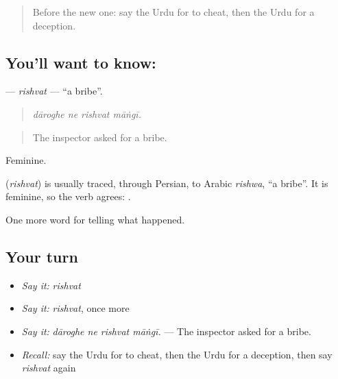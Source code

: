 \label{lesson:UR-C281-rishvat}



\begin{quote}
Before the new one: say the Urdu for to cheat, then the Urdu for a deception.
\end{quote}

\subsection*{You'll want to know: }
\textbf{} — \emph{rishvat} — \textquotedblleft{}a bribe\textquotedblright{}.

\begin{quote}
   
\end{quote}

\begin{quote}
\emph{dāroghe ne rishvat māṅgī.}
\end{quote}

\begin{quote}
The inspector asked for a bribe.
\end{quote}

Feminine.

\begin{cousinweb}
\textbf{} (\emph{rishvat}) is usually traced, through Persian, to Arabic \emph{rishwa}, \textquotedblleft{}a bribe\textquotedblright{}. It is feminine, so the verb agrees: \textbf{ }.
\end{cousinweb}

\begin{grammarlens}[title={What you've built}]
One more word for telling what happened.
\end{grammarlens}

\subsection*{Your turn}
\begin{itemize}
\raggedright
  \item \emph{Say it:} \emph{rishvat}
  \item \emph{Say it:} \emph{rishvat}, once more
  \item \emph{Say it:} \emph{dāroghe ne rishvat māṅgī.} — The inspector asked for a bribe.
  \item \emph{Recall:} say the Urdu for to cheat, then the Urdu for a deception, then say \emph{rishvat} again
\end{itemize}

